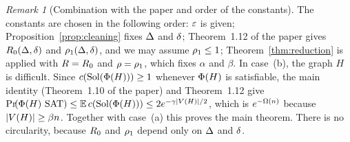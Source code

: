 \documentclass[11pt,a4paper]{article}
\theoremstyle{definition}
\theoremstyle{remark}
\newtheorem{remark}[theorem]{Remark}
\theoremstyle{plain}
\theoremstyle{definition}
\begin{document}
\begin{remark}[Combination with the paper and order of the constants]\label{rem:combination}
The constants are chosen in the following order: \(\varepsilon\) is given;
Proposition~\ref{prop:cleaning} fixes \(\Delta\) and \(\delta\);
Theorem~1.12 of the paper gives \(R_0(\Delta,\delta)\) and
\(\rho_1(\Delta,\delta)\), and we may assume \(\rho_1\le1\);
Theorem~\ref{thm:reduction} is applied with \(R=R_0\) and \(\rho=\rho_1\),
which fixes \(\alpha\) and \(\beta\). In case~(b), the graph \(H\) is
difficult. Since \(c(\operatorname{Sol}(\Phi(H)))\ge1\) whenever \(\Phi(H)\)
is satisfiable, the main identity (Theorem~1.10 of the paper) and
Theorem~1.12 give
\(\Prx{\rform{H}\SAT}\le\E\,\solcomp{\rform{H}}\le
2e^{-\rate|V(H)|/2}\), which is \(e^{-\Omega(n)}\) because
\(|V(H)|\ge\beta n\). Together with case~(a) this proves the main theorem. There
is no circularity, because \(R_0\) and \(\rho_1\) depend only on \(\Delta\)
and \(\delta\).
\end{remark}
\end{document}

